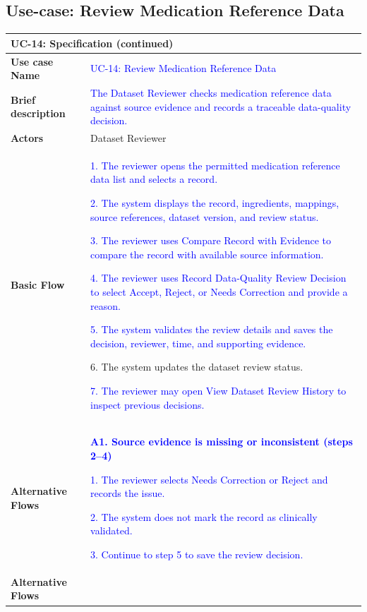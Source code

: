\subsection{Use-case: Review Medication Reference Data}
\label{uc:uc-14}
\begin{longtable}{|p{}|p{}|}
\hline
\endfirsthead
\multicolumn{2}{l}{\textbf{UC-14: Specification (continued)}}\\
\hline
\endhead
\textbf{Use case Name} &
\textcolor{blue}{UC-14: Review Medication Reference Data}
\\ \hline
\textbf{Brief description} &
\textcolor{blue}{The Dataset Reviewer checks medication reference data against source evidence and records a traceable data-quality decision.}
\\ \hline
\textbf{Actors} & Dataset Reviewer \\ \hline
\textbf{Basic Flow} &
\textcolor{blue}{1. The reviewer opens the permitted medication reference data list and selects a record.}\par
\textcolor{blue}{2. The system displays the record, ingredients, mappings, source references, dataset version, and review status.}\par
\textcolor{blue}{3. The reviewer uses Compare Record with Evidence to compare the record with available source information.}\par
\textcolor{blue}{4. The reviewer uses Record Data-Quality Review Decision to select Accept, Reject, or Needs Correction and provide a reason.}\par
\textcolor{blue}{5. The system validates the review details and saves the decision, reviewer, time, and supporting evidence.}\par
6. The system updates the dataset review status.\par
\textcolor{blue}{7. The reviewer may open View Dataset Review History to inspect previous decisions.}
\\ \hline
\textbf{Alternative Flows} &
\textcolor{blue}{\textbf{A1. Source evidence is missing or inconsistent (steps 2--4)}}\par
\textcolor{blue}{1. The reviewer selects Needs Correction or Reject and records the issue.}\par
\textcolor{blue}{2. The system does not mark the record as clinically validated.}\par
\textcolor{blue}{3. Continue to step 5 to save the review decision.}
\\ \hline
\textbf{Alternative Flows} &

\end{longtable}
